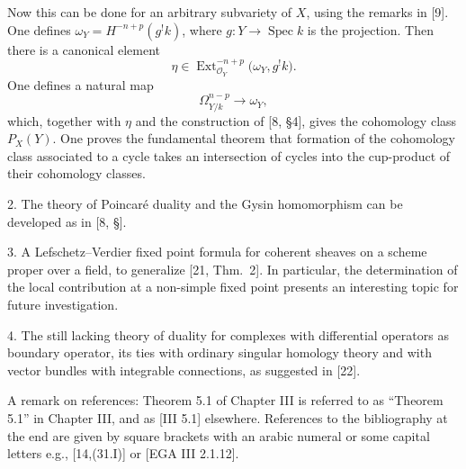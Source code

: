 \documentclass[12pt]{book}
\newcommand{\sheaf}[1]{\mathcal{#1}}
\DeclareMathOperator{\Ext}{Ext}
\begin{document}
\setcounter{page}{18}

Now this can be done for an arbitrary subvariety of \(X\), using the remarks in [9]. One defines \(\omega_{Y}=H^{-n+p}(g^! k)\), where \(g\colon Y\to \operatorname{Spec}k\) is the projection. Then there is a canonical element
\[
\eta \in \Ext_{\sheaf{O}_{Y}}^{-n+p}\bigl(\omega_{Y}, g^{!}k\bigr).
\]
One defines a natural map
\[
\Omega_{Y/k}^{n-p} \to \omega_{Y},
\]
which, together with \(\eta\) and the construction of [8, \S4], gives the cohomology class \(P_{X}(Y)\). One proves the fundamental theorem that formation of the cohomology class associated to a cycle takes an intersection of cycles into the cup-product of their cohomology classes.

2. The theory of Poincaré duality and the Gysin homomorphism can be developed as in [8, \S].

3. A Lefschetz--Verdier fixed point formula for coherent sheaves on a scheme proper over a field, to generalize [21, Thm.~2]. In particular, the determination of the local contribution at a non-simple fixed point presents an interesting topic for future investigation.

4. The still lacking theory of duality for complexes with differential operators as boundary operator, its ties with ordinary singular homology theory and with vector bundles with integrable connections, as suggested in [22].

\medskip
A remark on references: Theorem 5.1 of Chapter III is referred to as ``Theorem 5.1'' in Chapter III, and as [III 5.1] elsewhere. References to the bibliography at the end are given by square brackets with an arabic numeral or some capital letters e.g., [14,(31.I)] or [EGA III 2.1.12].
\end{document}
